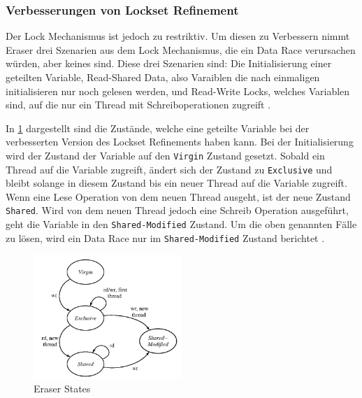 \subsubsection*{Verbesserungen von Lockset Refinement}

Der Lock Mechanismus ist jedoch zu restriktiv. Um diesen zu Verbessern nimmt Eraser drei Szenarien aus dem Lock Mechanismus, die ein Data Race verursachen würden, aber keines sind. Diese drei Szenarien sind: Die Initialisierung einer geteilten Variable, Read-Shared Data, also Varaiblen die nach einmaligen initialisieren nur noch gelesen werden, und Read-Write Locks, welches Variablen sind, auf die nur ein Thread mit Schreiboperationen zugreift \cite[vgl.][396-397]{savage_eraser_nodate}. 

In \ref{fig:eraserState} dargestellt sind die Zustände, welche eine geteilte Variable bei der verbesserten Version des Lockset Refinements haben kann. Bei der Initialisierung wird der Zustand der Variable auf den \texttt{Virgin} Zustand gesetzt. Sobald ein Thread auf die Variable zugreift, ändert sich der Zustand zu \texttt{Exclusive} und bleibt solange in diesem Zustand bis ein neuer Thread auf die Variable zugreift. Wenn eine Lese Operation von dem neuen Thread ausgeht, ist der neue Zustand \texttt{Shared}. Wird von dem neuen Thread jedoch eine Schreib Operation ausgeführt, geht die Variable in den \texttt{Shared-Modified} Zustand. Um die oben genannten Fälle zu lösen, wird ein Data Race nur im \texttt{Shared-Modified} Zustand berichtet \cite[vgl.][397-399]{savage_eraser_nodate}.   

\begin{figure}[ht]
    \centering
    \includegraphics[width=0.5\textwidth]{gfx/eraser_state.png}
    \caption{Eraser States \cite[389]{savage_eraser_nodate}}
    \label{fig:eraserState}
\end{figure}

